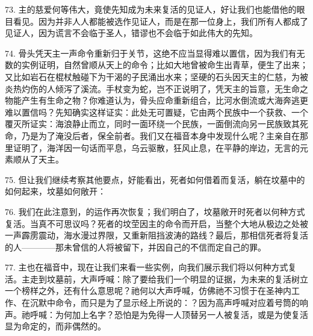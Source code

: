 73. 主的慈爱何等伟大，竟使先知成为未来复活的见证人，好让我们也能借他的眼目看见。因为并非人人都能被选作见证人，而是在那一位身上，我们所有人都成了见证人，因为谎言不会临于圣人，错谬也不会临于如此伟大的先知。\par

74. 骨头凭天主一声命令重新归于关节，这绝不应当显得难以置信，因为我们有无数的实例证明，自然曾顺从天上的命令；比如大地曾被命生出青草，便生了出来；又比如岩石在棍杖触碰下为干渴的子民涌出水来；坚硬的石头因天主的仁慈，为被炎热灼伤的人倾泻了溪流。手杖变为蛇，岂不正说明了，凭天主的旨意，无生命之物能产生有生命之物？你难道认为，骨头应命重新组合，比河水倒流或大海奔逃更难以置信吗？先知确实这样证实：此处无可置疑，它由两个民族中一个获救、一个覆灭所证实：海浪静止而立，同时一面环绕一个民族，一面倒流向另一民族致其死命，乃是为了淹没后者，保全前者。我们又在福音本身中发现什么呢？主亲自在那里证明了，海洋因一句话而平息，乌云驱散，狂风止息，在平静的岸边，无言的元素顺从了天主。\par

75. 但让我们继续考察其他要点，好能看出，死者如何借着而复活，躺在坟墓中的如何起来，坟墓如何敞开：\par

76. 我们在此注意到，的运作再次恢复；我们明白了，坟墓敞开时死者以何种方式复活。当真不可思议吗？死者的坟茔因主的命令而开启，当整个大地从极边之处被一声霹雳震动，海水漫过界限，又重新阻挡波涛的路线？最后，那相信死者将复活的人————那未曾信的人将被留下，并因自己的不信而定自己的罪。\par

77. 主也在福音中，现在让我们来看一些实例，向我们展示我们将以何种方式复活。主走到坟墓前，大声呼喊：除了要给我们一个明显的证据，为未来的复活树立一个榜样之外，还有什么意思呢？祂何以大声呼喊，仿佛祂不习惯于在圣神内工作、在沉默中命令，而只是为了显示经上所说的：？因为高声呼喊对应着号筒的响声。祂呼喊：为何加上名字？恐怕是为免得一人顶替另一人被复活，或是为使复活显为命定的，而非偶然的。\par


